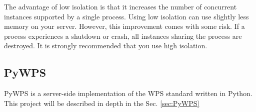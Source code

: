 The advantage of low isolation is that it increases the number of concurrent instances supported by a single process. Using low isolation can use slightly less memory on your server. However, this improvement comes with some risk. If a process experiences a shutdown or crash, all instances sharing the process are destroyed. It is strongly recommended that you use high isolation.\cite{AG_docs}

\subsection{PyWPS}
PyWPS is a server-side implementation of the WPS standard written in Python. This project will be described in depth in the Sec. \ref{sec:PyWPS}
